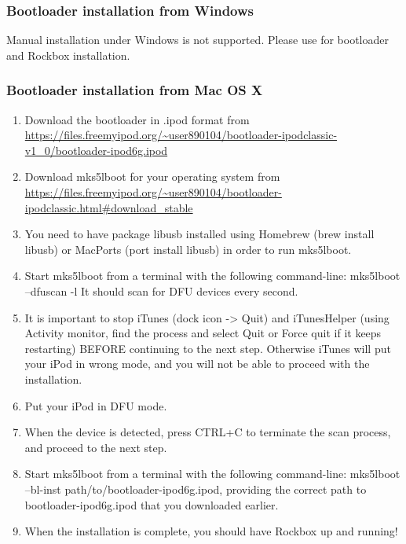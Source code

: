 
\subsubsection{Bootloader installation from Windows}

Manual installation under Windows is not supported. Please use  for bootloader and Rockbox installation.

\subsubsection{Bootloader installation from Mac OS X}


\begin{enumerate}

\item Download the bootloader in .ipod format from
\url{https://files.freemyipod.org/~user890104/bootloader-ipodclassic-v1_0/bootloader-ipod6g.ipod}

\item Download mks5lboot for your operating system from
\url{https://files.freemyipod.org/~user890104/bootloader-ipodclassic.html\#download_stable}

\item You need to have package libusb installed using Homebrew (brew install
libusb) or MacPorts (port install libusb) in order to run mks5lboot.

\item Start mks5lboot from a terminal with the following command-line:
mks5lboot --dfuscan -l It should scan for DFU devices every second.

\item It is important to stop iTunes (dock icon -> Quit) and iTunesHelper
(using Activity monitor, find the process and select Quit or Force
quit if it keeps restarting) BEFORE continuing to the next
step. Otherwise iTunes will put your iPod in wrong mode, and you will
not be able to proceed with the installation.

\item Put your iPod in DFU mode.

\item When the device is detected, press CTRL+C to terminate the scan
process, and proceed to the next step.

\item Start mks5lboot from a terminal with the following command-line:
mks5lboot --bl-inst path/to/bootloader-ipod6g.ipod, providing the
correct path to bootloader-ipod6g.ipod that you downloaded earlier.

\item When the installation is complete, you should have Rockbox up and
running!

\end{enumerate}

